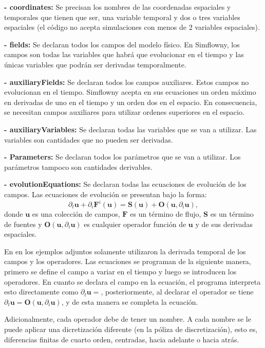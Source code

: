\documentclass[11pt]{article}
\begin{document}
{\bf - coordinates:}
Se precisan los nombres de las coordenadas espaciales y temporales que tienen que ser, una variable temporal y dos o tres variables espaciales (el código no acepta simulaciones con menos de 2 variables espaciales).

{\bf - fields:}
Se declaran todos los campos del modelo físico. En Simflowny, los campos son todas las variables que habrá que evolucionar en el tiempo y las únicas variables que podrán ser derivadas temporalmente.

{\bf - auxiliaryFields:}
Se declaran todos los campos auxiliares. Estos campos no evolucionan en el tiempo. Simflowny acepta en sus ecuaciones un orden máximo en derivadas de uno en el tiempo y un orden dos en el espacio. En consecuencia, se necesitan campos auxiliares para utilizar ordenes superiores en el espacio. 

{\bf - auxiliaryVariables:}
Se declaran todas las variables que se van a utilizar. Las variables son cantidades que no pueden ser derivadas.

{\bf - Parameters:}
Se declaran todos los parámetros que se van a utilizar. Los parámetros tampoco son cantidades derivables.


{\bf - evolutionEquations:}
Se declaran todas las ecuaciones de evolución de los campos. Las ecuaciones de evolución se presentan bajo la forma:
\begin{equation}
\partial_t\bm{u}+\partial_{i}\bm{F}^i(\bm{u})=\bm{S}(\bm{u})+\bm{O}(\bm{u},\partial_i\bm{u}),
\end{equation}
donde $\bm{u}$ es una colección de campos, $\bm{F}$ es un término de flujo, $\bm{S}$ es un término de fuentes y $\bm{O}(\bm{u},\partial_i\bm{u})$ es cualquier operador función de $\bm{u}$ y de sus derivadas espaciales.

En en los ejemplos adjuntos solamente utilizaron la derivada temporal de los campos y los operadores. Las ecuaciones se programan de la siguiente manera, primero se define el campo a variar en el tiempo y luego se introducen los operadores. En cuanto se declara el campo en la ecuación, el programa interpreta esto directamente como $\partial_t\bm{u}=$, posteriormente, al declarar el operador se tiene $\partial_t\bm{u}=\bm{O}(\bm{u},\partial_i\bm{u})$, y de esta manera se completa la ecuación.

Adicionalmente, cada operador debe de tener un nombre. A cada nombre se le puede aplicar una dicretización diferente (en la póliza de discretización), esto es, diferencias finitas de cuarto orden, centradas, hacia adelante o hacia atrás. 
\end{document}

